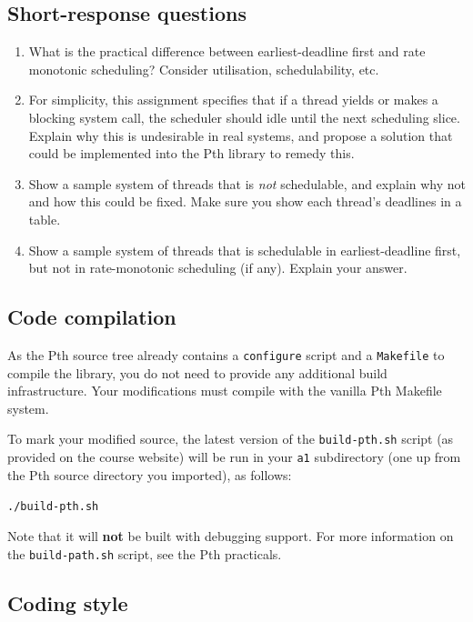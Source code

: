\documentclass[12pt,a4paper]{article}
\begin{document}
\subsection*{Short-response questions}

\begin{enumerate}
    \item What is the practical difference between earliest-deadline first and 
    rate monotonic scheduling? Consider utilisation, schedulability, etc.
    \item For simplicity, this assignment specifies that if a thread yields or
    makes a blocking system call, the scheduler should idle until the next
    scheduling slice. Explain why this is undesirable in real systems, and
    propose a solution that could be implemented into the Pth library to remedy
    this.
    \item Show a sample system of threads that is \textit{not} schedulable, and
    explain why not and how this could be fixed. Make sure you show each
    thread's deadlines in a table.
    \item Show a sample system of threads that is schedulable in
    earliest-deadline first, but not in rate-monotonic scheduling (if any). Explain your
    answer.
\end{enumerate}

\subsection*{Code compilation}

As the Pth source tree already contains a \texttt{configure} script and a
\texttt{Makefile} to compile the library, you do not need to provide any
additional build infrastructure. Your modifications must compile with the
vanilla Pth Makefile system.

To mark your modified source, the latest version of the \texttt{build-pth.sh} script (as provided on
the course website) will be run in your \texttt{a1} subdirectory (one up from
the Pth source directory you imported), as follows:

\noindent \texttt{./build-pth.sh}

Note that it will \textbf{not} be built with debugging support. For more information
on the \texttt{build-path.sh} script, see the Pth practicals.

\subsection*{Coding style}
\end{document}
